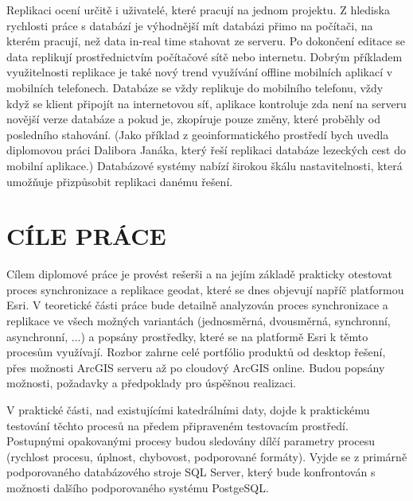 \documentclass{thesisKGI}
\begin{document}
      Replikaci ocení určitě i uživatelé, které pracují na jednom
      projektu. Z hlediska rychlosti práce s databází je výhodnější mít
      databázi přimo na počítači, na kterém pracují, než data in-real
      time stahovat ze serveru. Po dokončení editace se data replikují
      prostřednictvím počítačové sítě nebo internetu. Dobrým příkladem
      využitelnosti replikace je také nový trend využívání offline
      mobilních aplikací v mobilních telefonech. Databáze se vždy
      replikuje do mobilního telefonu, vždy když se klient připojít na
      internetovou síť, aplikace kontroluje zda není na serveru novější
      verze databáze a pokud je, zkopíruje pouze změny, které proběhly
      od posledního stahování. (Jako příklad z geoinformatického
      prostředí bych uvedla diplomovou práci Dalibora Janáka, který řeší
      replikaci databáze lezeckých cest do mobilní aplikace.) Databázové
      systémy nabízí širokou škálu nastavitelnosti, která umožňuje
      přizpůsobit replikaci danému řešení. 

    
    \newpage
    \section{CÍLE PRÁCE}

      Cílem diplomové práce je provést rešerši a na jejím základě
      prakticky otestovat proces synchronizace a replikace geodat, které
      se dnes objevují napříč platformou Esri. V teoretické části práce
      bude detailně analyzován proces synchronizace a replikace ve všech
      možných variantách (jednosměrná, dvousměrná, synchronní,
      asynchronní, ...) a popsány prostředky, které se na platformě Esri k
      těmto procesům využívají. Rozbor zahrne celé portfólio produktů od
      desktop řešení, přes možnosti ArcGIS serveru až po cloudový ArcGIS
      online. Budou popsány možnosti, požadavky a předpoklady pro úspěšnou
      realizaci.

      V praktické části, nad existujícími katedrálními daty, dojde k
      praktickému testování těchto procesů na předem připraveném
      testovacím prostředí. Postupnými opakovanými procesy budou sledovány
      dílčí parametry procesu (rychlost procesu, úplnost, chybovost,
      podporované formáty). Vyjde se z primárně podporovaného databázového
      stroje SQL Server, který bude konfrontován s možnosti dalšího
      podporovaného systému PostgeSQL.
\end{document}
